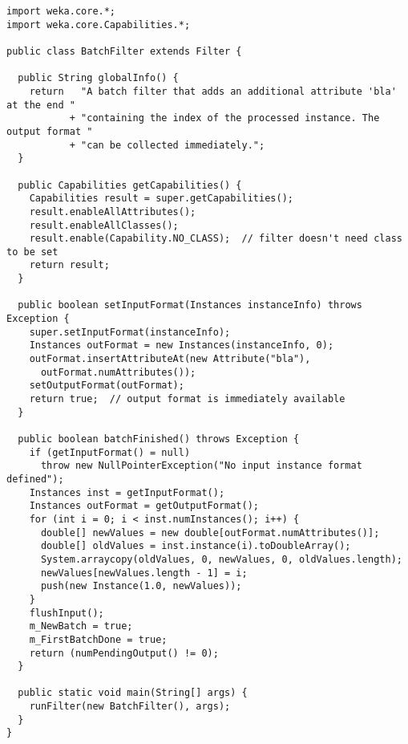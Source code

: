 
\begin{verbatim}
import weka.core.*;
import weka.core.Capabilities.*;

public class BatchFilter extends Filter {

  public String globalInfo() {
    return   "A batch filter that adds an additional attribute 'bla' at the end "
           + "containing the index of the processed instance. The output format "
           + "can be collected immediately.";
  }

  public Capabilities getCapabilities() {
    Capabilities result = super.getCapabilities();
    result.enableAllAttributes();
    result.enableAllClasses();
    result.enable(Capability.NO_CLASS);  // filter doesn't need class to be set
    return result;
  }

  public boolean setInputFormat(Instances instanceInfo) throws Exception {
    super.setInputFormat(instanceInfo);
    Instances outFormat = new Instances(instanceInfo, 0);
    outFormat.insertAttributeAt(new Attribute("bla"),
	  outFormat.numAttributes());
    setOutputFormat(outFormat);
    return true;  // output format is immediately available
  }

  public boolean batchFinished() throws Exception {
    if (getInputFormat() = null)
      throw new NullPointerException("No input instance format defined");
    Instances inst = getInputFormat();
    Instances outFormat = getOutputFormat();
    for (int i = 0; i < inst.numInstances(); i++) {
      double[] newValues = new double[outFormat.numAttributes()];
      double[] oldValues = inst.instance(i).toDoubleArray();
      System.arraycopy(oldValues, 0, newValues, 0, oldValues.length);
      newValues[newValues.length - 1] = i;
      push(new Instance(1.0, newValues));
    }
    flushInput();
    m_NewBatch = true;
    m_FirstBatchDone = true;
    return (numPendingOutput() != 0);
  }

  public static void main(String[] args) {
    runFilter(new BatchFilter(), args);
  }
}
\end{verbatim}
